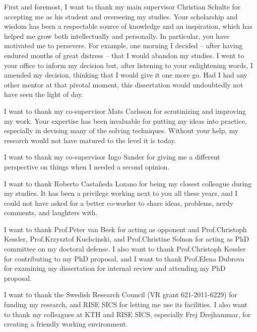 %

\begin{acknowledgements}
  First and foremost, I want to thank my main supervisor Christian Schulte for
  accepting me as his student and overseeing my studies.
  Your scholarship and wisdom has been a respectable source of knowledge and an
  inspiration, which has helped me grow both intellectually and personally.
  In particular, you have motivated me to persevere.
  For example, one morning I decided -- after having endured months of great
  distress -- that I would abandon my studies.
  I went to your office to inform my decision but, after listening to your
  enlightening words, I amended my decision, thinking that I would give it one
  more go.
  Had I had any other mentor at that pivotal moment, this dissertation would
  undoubtedly not have seen the light of day.

  I want to thank my co-supervisor Mats Carlsson for scrutinizing and improving
  my work.
  Your expertise has been invaluable for putting my ideas into practice,
  especially in devising many of the solving techniques.
  Without your help, my research would not have matured to the level it is
  today.

  I want to thank my co-supervisor Ingo Sander for giving me a different
  perspective on things when I needed a second opinion.

  I want to thank Roberto Casta\~neda Lozano for being my closest colleague
  during my studies.
  It has been a privilege working next to you all these years, and I could not
  have asked for a better co-worker to share ideas, problems, nerdy comments,
  and laughters with.

  I want to thank Prof.\thinspace Peter van Beek for acting as opponent and
  Prof.\thinspace Christoph Kessler, Prof.\thinspace Krzysztof Kuchcinski, and
  Prof.\thinspace Christine Solnon for acting as PhD committee on my doctoral
  defense.
  I also want to thank Prof.\thinspace Christoph Kessler for contributing to my
  PhD proposal, and I want to thank Prof.\thinspace Elena Dubrova for examining
  my dissertation for internal review and attending my PhD proposal.

  I want to thank the Swedish Research Council (VR grant 621-2011-6229) for
  funding my research, and RISE SICS for letting me use its facilities.
  I also want to thank my colleagues at KTH and RISE SICS, especially Frej
  Drejhammar, for creating a friendly working environment.


\end{acknowledgements}
